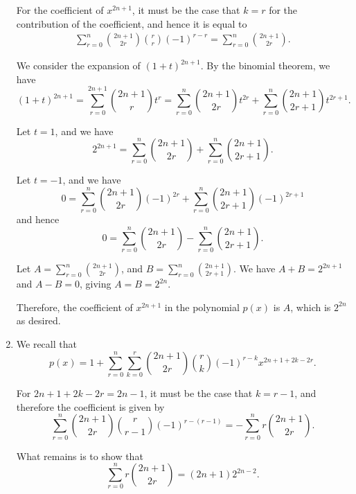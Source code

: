 \begin{enumerate}
          For the coefficient of \(x^{2n + 1}\), it must be the case that \(k = r\) for the contribution of the coefficient, and hence it is equal to
          \begin{align*}
              \sum_{r = 0}^{n} \binom{2n + 1}{2r} \binom{r}{r} (-1)^{r - r} = \sum_{r = 0}^{n} \binom{2n + 1}{2r}.
          \end{align*}

          We consider the expansion of \((1 + t)^{2n + 1}\). By the binomial theorem, we have
          \[
              (1 + t)^{2n + 1} = \sum_{r = 0}^{2n + 1} \binom{2n + 1}{r} t^r = \sum_{r = 0}^{n} \binom{2n + 1}{2r} t^{2r} + \sum_{r = 0}^{n} \binom{2n + 1}{2r + 1} t^{2r + 1}.
          \]

          Let \(t = 1\), and we have
          \[
              2^{2n + 1} = \sum_{r = 0}^{n} \binom{2n + 1}{2r} + \sum_{r = 0}^{n} \binom{2n + 1}{2r + 1}.
          \]

          Let \(t = -1\), and we have
          \[
              0 = \sum_{r = 0}^{n} \binom{2n + 1}{2r} (-1)^{2r} + \sum_{r = 0}^{n} \binom{2n + 1}{2r + 1} (-1)^{2r + 1}
          \]
          and hence
          \[
              0 = \sum_{r = 0}^{n} \binom{2n + 1}{2r} - \sum_{r = 0}^{n} \binom{2n + 1}{2r + 1}.
          \]

          Let \(A = \sum_{r = 0}^{n} \binom{2n + 1}{2r}\), and \(B = \sum_{r = 0}^{n} \binom{2n + 1}{2r + 1}\). We have \(A + B = 2^{2n + 1}\) and \(A - B = 0\), giving \(A = B = 2^{2n}\).

          Therefore, the coefficient of \(x^{2n + 1}\) in the polynomial \(p(x)\) is \(A\), which is \(2^{2n}\) as desired.

    \item We recall that
          \[
              p(x) = 1 + \sum_{r = 0}^{n} \sum_{k = 0}^{r} \binom{2n + 1}{2r} \binom{r}{k} (-1)^{r - k} x^{2n + 1 + 2k - 2r}.
          \]

          For \(2n + 1 + 2k - 2r = 2n - 1\), it must be the case that \(k = r - 1\), and therefore the coefficient is given by
          \[
              \sum_{r = 0}^{n} \binom{2n + 1}{2r} \binom{r}{r - 1} (-1)^{r - (r - 1)} = - \sum_{r = 0}^{n} r \binom{2n + 1}{2r}.
          \]

          What remains is to show that
          \[
              \sum_{r = 0}^{n} r \binom{2n + 1}{2r} = (2n + 1) 2^{2n - 2}.
          \]


\end{enumerate}

